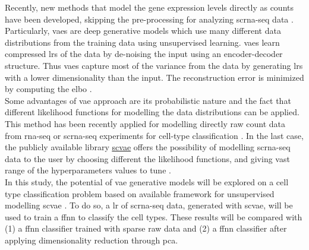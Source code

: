 \documentclass{article}
\begin{document}
\noindent Recently, new methods that model the gene expression levels directly as counts have been developed, skipping the pre-processing for analyzing \gls{scrna-seq} data \cite{Lopez2018, Eraslan2019}. 
Particularly, \glspl{vae} are deep generative models which use many different data distributions from the training data using unsupervised learning. 
\glspl{vae} learn compressed \glspl{lr} of the data by de-noising the input using an encoder-decoder structure. 
Thus \glspl{vae} capture most of the variance from the data by generating \glspl{lr} with a lower dimensionality than the input.
The reconstruction error is minimized by computing the \gls{elbo} \cite{kingma2014a}.\\

\noindent Some advantages of \gls{vae} approach are its probabilistic nature and the fact that different likelihood functions for modelling the data distributions can be applied. This method has been recently applied for modelling directly raw count data from \gls{rna-seq} \cite{Way2017} or \gls{scrna-seq} experiments for cell-type classification \cite{gronbech2020}. 
In the last case, the publicly available library \underline{\href{https://github.com/scvae/scvae}{\gls{scvae}}} offers the possibility of modelling \gls{scrna-seq} data to the user by choosing different the likelihood functions, and giving vast range of the hyperparameters values to tune \cite{gronbech2020}.\\

\noindent In this study, the potential of \gls{vae} generative models will be explored on a cell type classification problem based on available framework for unsupervised modelling \gls{scvae} \cite{gronbech2020}. 
To do so, a \gls{lr} of \gls{scrna-seq} data, generated with \gls{scvae}, will be used to train a \gls{ffnn} to classify the cell types.
These results will be compared with (1) a \gls{ffnn} classifier trained with sparse raw data and (2) a \gls{ffnn} classifier after applying dimensionality reduction through \gls{pca}.
\end{document}
